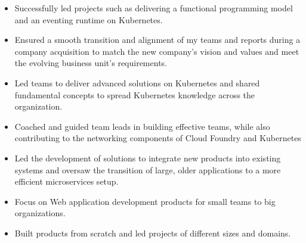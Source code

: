 \documentclass[10pt,a4paper,ragged2e,withhyper]{altacv}
\begin{document}
\begin{paracol}{2}


\begin{itemize}
    \item Successfully led projects such as delivering a functional programming model and an eventing runtime on Kubernetes.
    \item Ensured a smooth transition and alignment of my teams and reports during a company acquisition to match the new company's vision and values and meet the evolving business unit's requirements.
\end{itemize}
\divider

\begin{itemize}
    \item Led teams to deliver advanced solutions on Kubernetes and shared fundamental concepts to spread Kubernetes knowledge across the organization.
    \item Coached and guided team leads in building effective teams, while also contributing to the networking components of Cloud Foundry and Kubernetes
\end{itemize}

\divider

\begin{itemize}
    \item Led the development of solutions to integrate new products into existing systems and oversaw the transition of large, older applications to a more efficient microservices setup.
\end{itemize}

\divider

\begin{itemize}
    \item Focus on Web application development products for small teams to big organizations.
    \item Built products from scratch and led projects of different sizes and domains.
\end{itemize}


\end{paracol}
\end{document}
